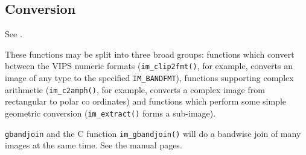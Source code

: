 \subsection{Conversion}

See .

These functions may be split into three broad groups: functions which convert
between the VIPS numeric formats (\verb+im_clip2fmt()+, for example, converts
an image of any type to the specified \verb+IM_BANDFMT+), functions
supporting complex arithmetic (\verb+im_c2amph()+, for example,  converts
a complex image from rectangular to polar co ordinates) and functions
which perform some simple geometric conversion (\verb+im_extract()+ forms
a sub-image).

\verb+gbandjoin+ and the C function \verb+im_gbandjoin()+ will do a bandwise
join of many images at the same time. See the manual pages.

